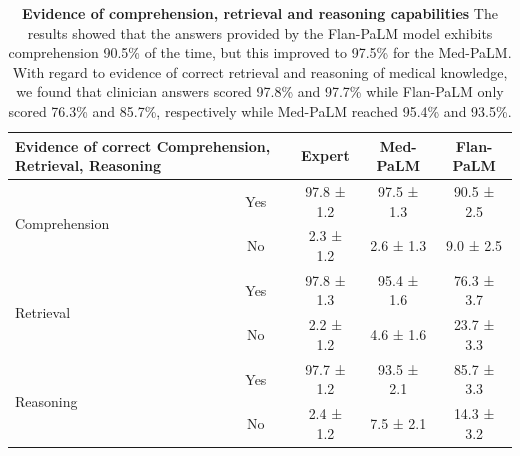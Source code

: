 \begin{table}[]
\small
\centering
\caption{\textbf{Evidence of comprehension, retrieval and reasoning capabilities} The results showed that the answers provided by the Flan-PaLM model exhibits comprehension 90.5\% of the time, but this improved to 97.5\% for the Med-PaLM. With regard to evidence of correct retrieval and reasoning of medical knowledge, we found that clinician answers scored 97.8\% and 97.7\%  while Flan-PaLM only scored 76.3\% and 85.7\%, respectively while Med-PaLM reached 95.4\% and 93.5\%. }
\vspace{3pt}
\label{tab:detailed-expert-4}
\begin{tabular}{l|c|ccc}
\toprule
\multicolumn{2}{l|}{\textbf{Evidence of correct Comprehension, Retrieval, Reasoning}} & \textbf{Expert} & \textbf{Med-PaLM} & \textbf{Flan-PaLM} \\ \hline
\multirow{2}{*}{Comprehension} & Yes & 97.8  ± 1.2 & 97.5 ± 1.3 & 90.5 ± 2.5 \\
                               & No  & 2.3 ± 1.2   & 2.6  ± 1.3 & 9.0 ± 2.5  \\ \hline
\multirow{2}{*}{Retrieval}     & Yes & 97.8  ± 1.3 & 95.4 ± 1.6 & 76.3 ± 3.7 \\
                               & No  & 2.2 ± 1.2   & 4.6  ± 1.6 & 23.7 ± 3.3 \\ \hline
\multirow{2}{*}{Reasoning}     & Yes & 97.7  ± 1.2 & 93.5 ± 2.1 & 85.7 ± 3.3 \\ 
                               & No  & 2.4 ± 1.2   & 7.5  ± 2.1 & 14.3 ± 3.2
                               \\ \bottomrule
\end{tabular}
\end{table}



